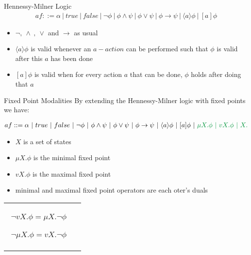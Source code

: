 \documentclass[aspectratio=1610]{beamer}
\begin{document}
  \begin{frame}{Hennessy-Milner Logic}
    \begin{align*}
      af ::= \alpha\ |\ true\ |\ false\ |\ \neg \phi\ |\ \phi \land \psi\ |\ \phi \lor \psi\ |\ \phi \to \psi\ |\ \langle a \rangle \phi \ |\ [a]\phi
    \end{align*}
    \begin{itemize}
      \item $\neg ,\ \land\ ,\ \lor$ and $\to$ as usual
      \item $\langle a \rangle \phi$ is valid whenever an $a-action$ can be performed such that $\phi$ is valid after this $a$ has been done
      \item $[a]\phi$ is valid when for every action $a$ that can be done, $\phi$ holds after doing that $a$
    \end{itemize}
  \end{frame}

  \begin{frame}{Fixed Point Modalities}
    By extending the Hennessy-Milner logic with fixed points we have:
    \resizebox{ \textwidth}{!} {
      \begin{minipage}{\textwidth}
        \begin{align*}
          af ::= \alpha\ |\ true\ |\ false\ |\ \neg \phi\ |\ \phi \land \psi\ |\ \phi \lor \psi\ |\ \phi \to \psi\ |\ \langle a \rangle \phi \ |\ [a]\phi\ |\ \color{green} \mu X. \phi \ |\ vX. \phi \ |\ X.
        \end{align*}
      \end{minipage}
    }
    \begin{itemize}
      \item $X$ is a set of states
      \item $\mu X. \phi$ is the minimal fixed point
      \item $vX. \phi$ is the maximal fixed point
      \item minimal and maximal fixed point operators are each oter's duals
    \end{itemize}
    \begin{tabular}{cc}
      \begin{minipage}{.47\linewidth}
        \begin{align*}
          \neg vX. \phi = \mu X. \neg \phi
        \end{align*}
      \end{minipage}
      \begin{minipage}{.47\linewidth}
        \begin{align*}
          \neg \mu X. \phi = vX. \neg \phi
        \end{align*}
      \end{minipage}
    \end{tabular}
  \end{frame}
\end{document}
